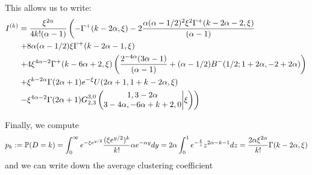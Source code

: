 This allows us to write:
\begin{align*}
I^{(k)}&=\frac{\xi^{2\alpha}}{4k!(\alpha-1)} \left( -\Gamma^+(k - 2 \alpha, \xi) - 2\frac{\alpha (\alpha - 1/2)^2 \xi^{2} \Gamma^+(k - 2 \alpha - 2, \xi)}{(\alpha - 1)} \right. \\ 
&\left.+ 8 \alpha (\alpha - 1/2) \xi \Gamma^+(k - 2 \alpha - 1,\xi) \right.\\ 
&\left.+ 4\xi^{4\alpha - 2} \Gamma^+(k - 6 \alpha + 2, 
      \xi) \left( \frac{2^{ - 4\alpha}(3 \alpha - 1)}{(\alpha - 1)} + (\alpha - 1/2) B^-(1/2; 1 + 2 \alpha, -2 + 2 \alpha) \right)  \right.\\ 
&\left.+ \xi^{k-2\alpha} \Gamma(2\alpha+1)e^{-\xi} U(2\alpha+1,1+k-2\alpha,\xi) \right. \\ 
&\left.- \xi^{4\alpha-2} \Gamma(2\alpha+1)\MeijerG{3}{0}{2}{3}{1,3-2\alpha}{3-4\alpha,-6\alpha+k+2,0}{\xi}  \right)
\end{align*}%


Finally, we compute 
\begin{align*}
p_k := \Pee( D=k ) = \int_0^\infty e^{-\xi e^{y/2}} \frac{(\xi e^{y/2})^k}{k!}\alpha e^{-\alpha y} dy = 2\alpha \int_0^1 e^{-\frac{\xi}{z}} z^{2\alpha -k-1} dz =\frac{2\alpha \xi^{2\alpha}}{k!} \Gamma(k-2\alpha,\xi)
\end{align*}
and we can write down the average clustering coefficient

